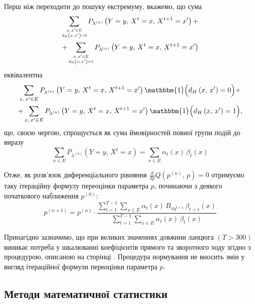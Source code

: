 Перш ніж переходити до пошуку екстремуму, вкажемо, що сума
\begin{multline*}
    \sum\limits_{\scaleq[0.8]{\substack{x,\,x' \in E \\ d_H\left( x,\,x' \right) = 0}}} P_{\lambda^{(n)}} \left( Y=y,\, X^t=x,\, X^{t+1}=x' \right) + \\ + \sum\limits_{\scaleq[0.8]{\substack{x,\,x' \in E \\ d_H\left( x,\,x' \right) = 1}}} P_{\lambda^{(n)}} \left( Y=y,\, X^t=x,\, X^{t+1}=x' \right)
\end{multline*}\label{eq: simplified denominator}
еквівалентна
\begin{multline*}
    \sum\limits_{x,\,x' \in E} P_{\lambda^{(n)}} \left( Y=y,\, X^t=x,\, X^{t+1}=x' \right) \mathbbm{1} \Bigl( d_H\left( x,\,x' \right) = 0 \Bigr) + \\ + \sum\limits_{x,\,x' \in E} P_{\lambda^{(n)}} \left( Y=y,\, X^t=x,\, X^{t+1}=x' \right) \mathbbm{1} \Bigl( d_H\left( x,\,x' \right) = 1 \Bigr),
\end{multline*}
що, своєю чергою, спрощується як сума ймовірностей повної групи подій до виразу
\begin{equation*}
    \sum\limits_{x \in E} P_{\lambda^{(n)}} \left( Y=y,\, X^t=x \right) = \sum\limits_{x \in E} \alpha_t(x)\,\beta_t(x)
\end{equation*}

Отже, як розв'язок диференціального рівняння $\frac{d}{dp} Q\left( p^{(n)},\,p \right) = 0$ отримуємо таку ітераційну формулу переоцінки параметра $p$, починаючи з деякого початкового наближення $p^{(0)}:$
\begin{equation}\label{eq: p baum-welch estimation}
    p^{(n+1)} = p^{(n)} \cdot \frac{
        \sum\limits_{t=1}^{T-1} \sum\limits_{x \in E} \alpha_t(x)\,B_{xy^{t+1}}\,\beta_{t+1}(x)
    }{
        \sum\limits_{t=1}^{T-1}\sum\limits_{x \in E} \alpha_t(x)\,\beta_t(x)
    }
\end{equation}

Принагідно зазначимо, що при великих значеннях довжини ланцюга $(T>300)$ виникає потреба у шкалюванні коефіцієнтів прямого та зворотного ходу згідно з процедурою, описаною на сторінці \pageref{eq: alpha, forward algorithm coefficients}. Процедура нормування не вносить змін у вигляд ітераційної формули переоцінки параметра $p$.

\subsection{Методи математичної статистики}

